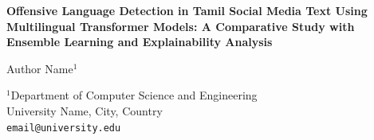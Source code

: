 \documentclass[12pt, a4paper]{article}
\begin{document}

\begin{center}
    \vspace*{1cm}
    {\LARGE\bfseries Offensive Language Detection in Tamil Social Media Text Using Multilingual Transformer Models: A Comparative Study with Ensemble Learning and Explainability Analysis\par}
    
    \vspace{1.5cm}
    
    {\large Author Name$^{1}$\par}
    \vspace{0.5cm}
    {\normalsize $^{1}$Department of Computer Science and Engineering\\
    University Name, City, Country\\
    \texttt{email@university.edu}\par}
    
    \vspace{1.5cm}
\end{center}

\end{document}
